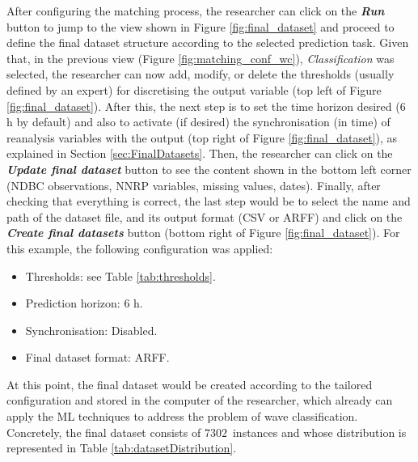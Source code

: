 \documentclass[energies,article,accept,moreauthors,pdftex]{Definitions/mdpi}
\begin{document}
\begin{paracol}{2}
			
			
			After configuring the matching process, the researcher can click on the \textbf{\textit{Run}} button to jump to the view shown in Figure \ref{fig:final_dataset} and proceed to define the final dataset structure according to the selected prediction task. Given that, in the previous view (Figure \ref{fig:matching_conf_wc}), \textit{Classification} was selected, the researcher can now add, modify, or delete the thresholds (usually defined by an expert) for discretising the output variable (top left of Figure \ref{fig:final_dataset}). After this, the next step is to set the time horizon desired (6 h by default) and also to activate (if desired) the synchronisation (in time) of reanalysis variables with the output (top right of Figure \ref{fig:final_dataset}), as explained in Section {\ref{sec:FinalDatasets}}. Then, the researcher can click on the \textbf{\textit{Update final dataset}} button to see the content shown in the bottom left corner (NDBC observations, NNRP variables, missing values, dates). Finally, after checking that everything is correct, the last step would be to select the name and path of the dataset file, and its output format (CSV or ARFF) and click on the \textbf{\textit{Create final datasets}} button (bottom right of Figure  \ref{fig:final_dataset}). For this example, the following configuration was applied:
			\begin{itemize}
				\item Thresholds: see Table \ref{tab:thresholds}.
				\item Prediction horizon: 6 h.
				\item Synchronisation: Disabled.
				\item Final dataset format: ARFF.
			\end{itemize}
			
			At this point, the final dataset would be created according to the tailored configuration and stored in the computer of the researcher, which already can apply the ML techniques to address the problem of wave classification. Concretely, the final dataset consists of \mbox{$7302$ instances} and whose distribution is represented in Table \ref{tab:datasetDistribution}.
			
			
			
			
\end{paracol}
\nointerlineskip
\end{document}
